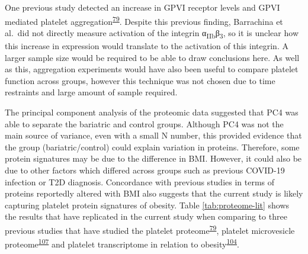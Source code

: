 \documentclass[11pt,twoside]{bristolthesis}
\begin{document}
One previous study detected an increase in GPVI receptor levels and GPVI mediated platelet aggregation\textsuperscript{\protect\hyperlink{ref-Barrachina2019}{79}}. Despite this previous finding, Barrachina et al.~did not directly measure activation of the integrin α\textsubscript{IIb}β\textsubscript{3}, so it is unclear how this increase in expression would translate to the activation of this integrin. A larger sample size would be required to be able to draw conclusions here. As well as this, aggregation experiments would have also been useful to compare platelet function across groups, however this technique was not chosen due to time restraints and large amount of sample required.

The principal component analysis of the proteomic data suggested that PC4 was able to separate the bariatric and control groups. Although PC4 was not the main source of variance, even with a small N number, this provided evidence that the group (bariatric/control) could explain variation in proteins. Therefore, some protein signatures may be due to the difference in BMI. However, it could also be due to other factors which differed across groups such as previous COVID-19 infection or T2D diagnosis. Concordance with previous studies in terms of proteins reportedly altered with BMI also suggests that the current study is likely capturing platelet protein signatures of obesity. Table \ref{tab:proteome-lit} shows the results that have replicated in the current study when comparing to three previous studies that have studied the platelet proteome\textsuperscript{\protect\hyperlink{ref-Barrachina2019}{79}}, platelet microvesicle proteome\textsuperscript{\protect\hyperlink{ref-Grande2019}{107}} and platelet transcriptome in relation to obesity\textsuperscript{\protect\hyperlink{ref-Freedman2010}{104}}.
\end{document}
